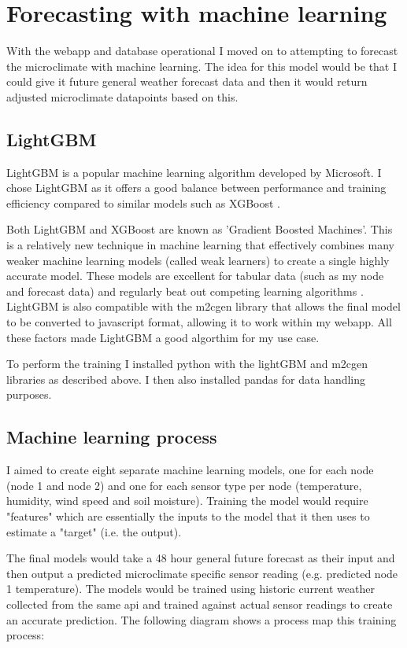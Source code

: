 \section{Forecasting with machine learning}\label{sec:machine-learning}

With the webapp and database operational I moved on to attempting to forecast
the microclimate with machine learning. The idea for this model would be that I
could give it future general weather forecast data and then it would return
adjusted microclimate datapoints based on this.


\subsection{LightGBM}

LightGBM is a popular machine learning algorithm developed by Microsoft. I chose
LightGBM as it offers a good balance between performance and training efficiency
compared to similar models such as XGBoost \cite{saha2025}.

Both LightGBM and XGBoost are known as 'Gradient Boosted Machines'. This is a
relatively new technique in machine learning that effectively combines many
weaker machine learning models (called weak learners) to create a single highly
accurate model. These models are excellent for tabular data (such as my node and
forecast data) and regularly beat out competing learning algorithms
\cite{tuychiev2023}. LightGBM is also compatible with the m2cgen library that
allows the final model to be converted to javascript format, allowing it to work
within my webapp. All these factors made LightGBM a good algorthim for my use
case.

To perform the training I installed python with the lightGBM  and m2cgen
libraries as described above. I then also installed pandas for data handling
purposes.

\subsection{Machine learning process}

I aimed to create eight separate machine learning models, one for each node
(node 1 and node 2) and one for each sensor type per node (temperature,
humidity, wind speed and soil moisture). Training the model would require
"features" which are essentially the inputs to the model that it then uses to
estimate a "target" (i.e. the output).

The final models would take a 48 hour general future forecast as their input and
then output a predicted microclimate specific sensor reading (e.g. predicted
node 1 temperature). The models would be trained using historic current weather
collected from the same api and trained against actual sensor readings to create
an accurate prediction. The following diagram shows a process map this training
process:

